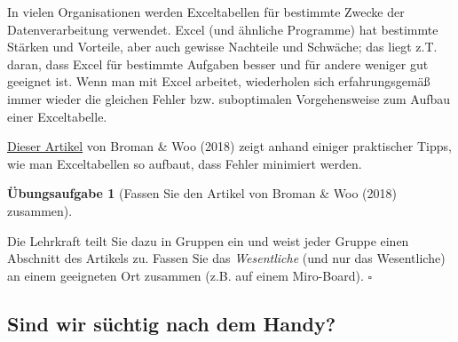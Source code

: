 \documentclass[
  letterpaper,
]{scrbook}
\theoremstyle{definition}
\theoremstyle{definition}
\theoremstyle{definition}
\newtheorem{exercise}{Übungsaufgabe}[chapter]
\theoremstyle{remark}
\begin{document}
In vielen Organisationen werden Exceltabellen für bestimmte Zwecke der
Datenverarbeitung verwendet. Excel (und ähnliche Programme) hat
bestimmte Stärken und Vorteile, aber auch gewisse Nachteile und
Schwäche; das liegt z.T. daran, dass Excel für bestimmte Aufgaben besser
und für andere weniger gut geeignet ist. Wenn man mit Excel arbeitet,
wiederholen sich erfahrungsgemäß immer wieder die gleichen Fehler bzw.
suboptimalen Vorgehensweise zum Aufbau einer Exceltabelle.

\href{https://www.tandfonline.com/doi/full/10.1080/00031305.2017.1375989}{Dieser
Artikel} von Broman \& Woo (2018) zeigt anhand einiger praktischer
Tipps, wie man Exceltabellen so aufbaut, dass Fehler minimiert werden.

\begin{exercise}[Fassen Sie den Artikel von Broman \& Woo (2018)
zusammen]\protect\hypertarget{exr-xls-paper}{}\label{exr-xls-paper}

Die Lehrkraft teilt Sie dazu in Gruppen ein und weist jeder Gruppe einen
Abschnitt des Artikels zu. Fassen Sie das \emph{Wesentliche} (und nur
das Wesentliche) an einem geeigneten Ort zusammen (z.B. auf einem
Miro-Board). \(\square\)

\end{exercise}

\subsection{Sind wir süchtig nach dem
Handy?}\label{sind-wir-suxfcchtig-nach-dem-handy}
\end{document}
